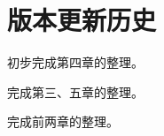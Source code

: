 \chapter*{版本更新历史}


\begin{change}
  \item 初步完成第四章的整理。
\end{change}


\begin{change}
  \item 完成第三、五章的整理。
\end{change}


\begin{change}
  \item 完成前两章的整理。
\end{change}